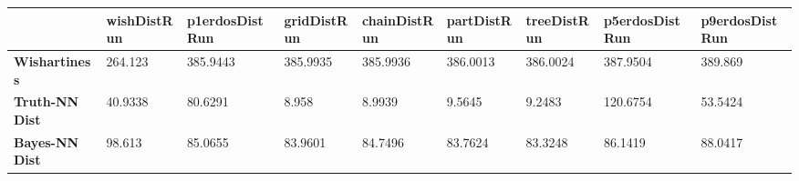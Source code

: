 \begin{tabular}{|l|l|l|l|l|l|l|l|l|}
\hline
&\textbf{wishDistRun}&\textbf{p1erdosDistRun}&\textbf{gridDistRun}&\textbf{chainDistRun}&\textbf{partDistRun}&\textbf{treeDistRun}&\textbf{p5erdosDistRun}&\textbf{p9erdosDistRun}\\\hline
\textbf{Wishartiness}&264.123&385.9443&385.9935&385.9936&386.0013&386.0024&387.9504&389.869\\\hline
\textbf{Truth-NN Dist}&40.9338&80.6291&8.958&8.9939&9.5645&9.2483&120.6754&53.5424\\\hline
\textbf{Bayes-NN Dist}&98.613&85.0655&83.9601&84.7496&83.7624&83.3248&86.1419&88.0417\\\hline
\end{tabular}
